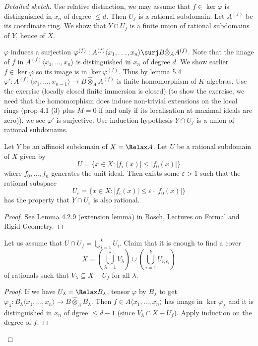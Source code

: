 \documentclass[a4paper]{article}
\let\Sp\Relax
\DeclareMathOperator{\Sp}{Sp} %
\begin{document}
\begin{proof}[Detailed sketch]
  Use relative distinction, we may assume that \(f \in \ker \varphi\) is distinguished in \(x_n\) of degree \(\leq d\). Then \(U_f\) is a rational subdomain. Let \(A^{(f)}\) be its coordinate ring. We show that \(Y \cap U_f\) is a finite union of rational subdomains of \(Y\), hence of \(X\).

  \(\varphi\) induces a surjection \(\varphi^{(f)}: A^{(f)}\langle x_1, \dots, x_n \rangle \surj B \hat \otimes_A A^{(f)}\). Note that the image of \(f\) in \(A^{(f)}\langle x_1, \dots, x_n \rangle\) is distinguished in \(x_n\) of degree \(d\). We show earlier \(f \in \ker \varphi\) so its image is in \(\ker \varphi^{(f)}\). Thus by lemma 5.4 \(\varphi': A^{(f)}\langle x_1, \dots, x_{n - 1} \rangle \to B \hat \otimes_A A^{(f)}\) is finite homomorphism of \(K\)-algebras. Use the exercise (locally closed finite immersion is closed) (to show the exercise, we need that the homomorphism does induce non-trivial extensions on the local rings (prop 4.1 (3) plus \(M = 0\) if and only if its localisation at maximal ideals are zero)), we see \(\varphi'\) is surjective. Use induction hypothesis \(Y \cap U_f\) is a union of rational subdomains.

  \begin{lemma}
    Let \(Y\) be an affinoid subdomain of \(X = \Sp A\). Let \(U\) be a rational subdomain of \(X\) given by
    \[
      U = \{x \in X: |f_i(x)| \leq |f_0(x)|\}
    \]
    where \(f_0, \dots, f_n\) generates the unit ideal. Then exists some \(\varepsilon > 1\) such that the rational subspace
    \[
      U_\varepsilon = \{x \in X: |f_i(x)| \leq \varepsilon \cdot |f_0(x)|\}
    \]
    has the property that \(Y \cap U_\varepsilon\) is also rational.
  \end{lemma}

  \begin{proof}
    See Lemma 4.2.9 (extension lemma) in Bosch, Lectures on Formal and Rigid Geometry.
  \end{proof}

  Let us assume that \(U \cap U_f = \bigcup_{i = 1}^k U_i\). Claim that it is enough to find a cover
  \[
    X = (\bigcup_{\lambda = 1}^s V_\lambda) \cup (\bigcup_{i = 1}^k U_{i, \varepsilon_i})
  \]
  of rationals such that \(V_\lambda \subseteq X - U_f\) for all \(\lambda\).

  \begin{proof}
    If we have \(U_\lambda = \Sp B_\lambda\), tensor \(\varphi\) by \(B_\lambda\) to get \(\varphi_\lambda: B_\lambda \langle x_1, \dots, x_n \rangle \to B \hat \otimes_A B_\lambda\). Then \(f \in A \langle x_1, \dots, x_n\rangle\) has image in \(\ker \varphi_\lambda\) and it is distinguished in \(x_n\) of dgree \(\leq d - 1\) (since \(V_\lambda \cap X - U_f\)). Apply induction on the degree of \(f\).
  \end{proof}


\end{proof}
\end{document}
